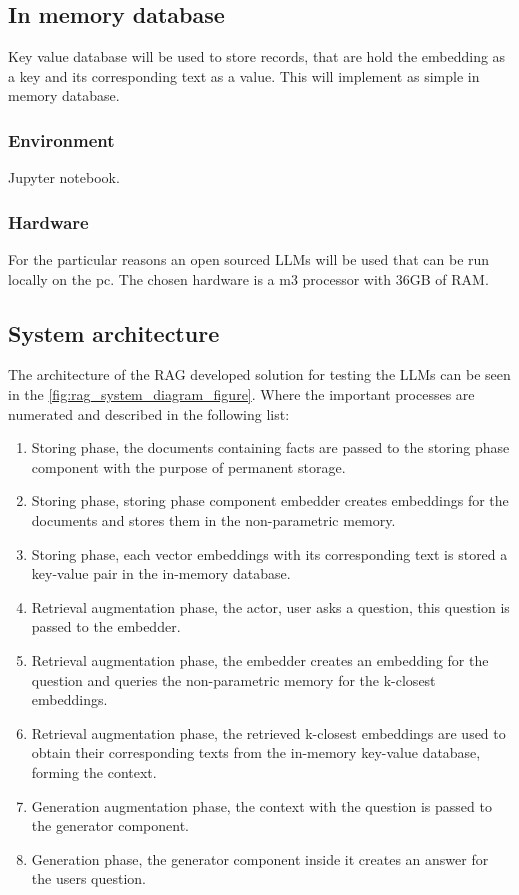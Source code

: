 \documentclass{wseas}
\begin{document}
\subsection{In memory database}
Key value database will be used to store records, that are hold the embedding as a key
and its corresponding text as a value. This will implement as simple in memory database.
\subsubsection{Environment}

Jupyter notebook.

\subsubsection{Hardware}

For the particular reasons an open sourced LLMs will be used that can be
run locally on the pc. The chosen hardware is a m3 processor with 36GB
of RAM.

\subsection{System architecture}
The architecture of the RAG developed solution for testing the LLMs can be seen in the \autoref{fig:rag_system_diagram_figure}. 
Where the important processes are numerated and described in the following list: 

\begin{enumerate}
  \item Storing phase, the documents containing facts are passed to the storing phase component with the purpose of permanent storage.
  \item Storing phase, storing phase component embedder creates embeddings for the documents and stores them in the non-parametric memory.
  \item Storing phase, each vector embeddings with its corresponding text is stored a key-value pair in the in-memory database.
  \item Retrieval augmentation phase, the actor, user asks a question, this question is passed to the embedder.
  \item Retrieval augmentation phase, the embedder creates an embedding for the question and queries the non-parametric memory for the k-closest embeddings.
  \item Retrieval augmentation phase, the retrieved k-closest embeddings are used to obtain their corresponding texts from the in-memory key-value database, forming the context.
  \item Generation augmentation phase, the context with the question is passed to the generator component.
  \item Generation phase, the generator component inside it creates an answer for the users question.
\end{enumerate}
\end{document}
